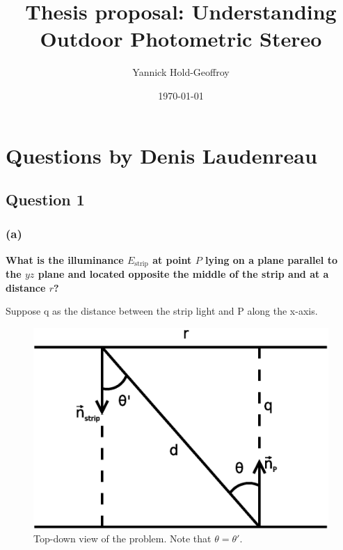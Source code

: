 \documentclass{report}
\title{Thesis proposal: Understanding Outdoor Photometric Stereo}
\author{Yannick Hold-Geoffroy}
\date{\today}
\begin{document}

\maketitle

\tableofcontents

\hypersetup{colorlinks=true,linkcolor=blue}

\newcommand*\B[1]{\mathbf{#1}}
\newcommand{\boldomega}{\boldsymbol \omega} %
\newcommand{\boldmu}{\boldsymbol \mu} %
\newcommand{\bolddelta}{\boldsymbol \delta} %

\newcommand\norm[1]{\left\lVert#1\right\rVert}

\newcommand\todo[1]{\textcolor{red}{TODO: #1}}

\graphicspath{{figures/}}

\chapter{Questions by Denis Laudenreau}

\section{Question 1}

\subsection{(a)}
\textbf{What is the illuminance $E_{\text{strip}}$ at point $P$ lying on a plane parallel to the $yz$ plane and located opposite the middle of the strip and at a distance $r$?}

Suppose q as the distance between the strip light and P along the x-axis.

\begin{figure}
  \centering
  \includegraphics[width=0.45\linewidth]{q1a_setup.eps}
  \caption[Problem setup]
   {Top-down view of the problem. Note that $\theta = \theta'$.}
  \label{q1a:setup}
\end{figure}
\end{document}
